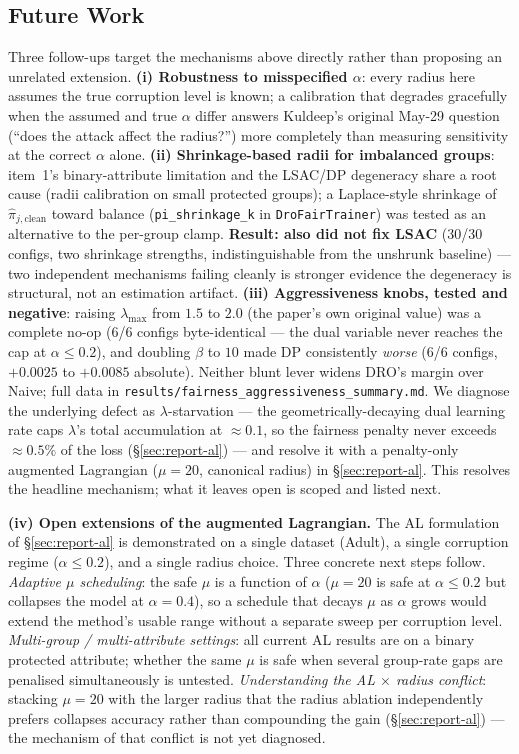 \documentclass[11pt,a4paper]{article}
\begin{document}
\subsection{Future Work}

Three follow-ups target the mechanisms above directly rather than
proposing an unrelated extension. \textbf{(i) Robustness to
misspecified $\alpha$}: every radius here assumes the true corruption
level is known; a calibration that degrades gracefully when the assumed
and true $\alpha$ differ answers Kuldeep's original May-29 question
(``does the attack affect the radius?'') more completely than measuring
sensitivity at the correct $\alpha$ alone. \textbf{(ii) Shrinkage-based
radii for imbalanced groups}: item~1's binary-attribute limitation and
the LSAC/DP degeneracy share a root cause (radii calibration on small
protected groups); a Laplace-style shrinkage of $\hat\pi_{j,\mathrm{clean}}$
toward balance (\texttt{pi\_shrinkage\_k} in \texttt{DroFairTrainer}) was
tested as an alternative to the per-group clamp. \textbf{Result: also did
not fix LSAC} (30/30 configs, two shrinkage strengths, indistinguishable
from the unshrunk baseline) --- two independent mechanisms failing
cleanly is stronger evidence the degeneracy is structural, not an
estimation artifact.
\textbf{(iii) Aggressiveness knobs, tested and negative}: raising
$\lambda_{\max}$ from $1.5$ to $2.0$ (the paper's own original value) was
a complete no-op (6/6 configs byte-identical --- the dual variable never
reaches the cap at $\alpha\le0.2$), and doubling $\beta$ to $10$ made DP
consistently \emph{worse} (6/6 configs, $+0.0025$ to $+0.0085$ absolute).
Neither blunt lever widens DRO's margin over Naive; full data in
\texttt{results/fairness\_aggressiveness\_summary.md}. We diagnose the
underlying defect as $\lambda$-starvation --- the geometrically-decaying
dual learning rate caps $\lambda$'s total accumulation at $\approx0.1$,
so the fairness penalty never exceeds $\approx0.5\%$ of the loss
(\S\ref{sec:report-al}) --- and resolve it with a penalty-only
augmented Lagrangian ($\mu{=}20$, canonical radius) in
\S\ref{sec:report-al}. This resolves the headline mechanism; what it
leaves open is scoped and listed next.

\textbf{(iv) Open extensions of the augmented Lagrangian.} The AL
formulation of \S\ref{sec:report-al} is demonstrated on a single
dataset (Adult), a single corruption regime ($\alpha\le0.2$), and a
single radius choice. Three concrete next steps follow.
\emph{Adaptive $\mu$ scheduling}: the safe $\mu$ is a function of
$\alpha$ ($\mu{=}20$ is safe at $\alpha\le0.2$ but collapses the model
at $\alpha{=}0.4$), so a schedule that decays $\mu$ as $\alpha$ grows
would extend the method's usable range without a separate sweep per
corruption level. \emph{Multi-group / multi-attribute settings}: all
current AL results are on a binary protected attribute; whether the same
$\mu$ is safe when several group-rate gaps are penalised simultaneously
is untested. \emph{Understanding the AL $\times$ radius conflict}:
stacking $\mu{=}20$ with the larger radius that the radius ablation
independently prefers collapses accuracy rather than compounding the gain
(\S\ref{sec:report-al}) --- the mechanism of that conflict is not yet
diagnosed.
\end{document}
